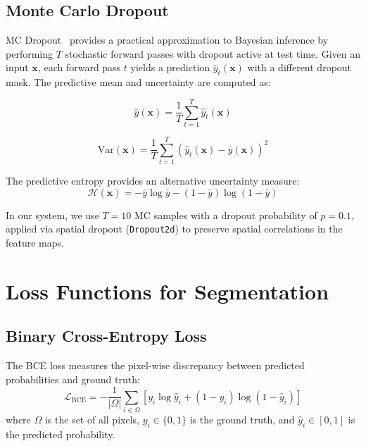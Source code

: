 \subsection{Monte Carlo Dropout}
\label{sec:bg:mcdropout}

\ac{MC} Dropout~\cite{gal2016dropout} provides a practical approximation to Bayesian inference by performing $T$ stochastic forward passes with dropout active at test time. Given an input $\mathbf{x}$, each forward pass $t$ yields a prediction $\hat{y}_t(\mathbf{x})$ with a different dropout mask. The predictive mean and uncertainty are computed as:

\begin{equation}
	\bar{y}(\mathbf{x}) = \frac{1}{T} \sum_{t=1}^{T} \hat{y}_t(\mathbf{x})
\end{equation}

\begin{equation}
	\text{Var}(\mathbf{x}) = \frac{1}{T} \sum_{t=1}^{T} \left(\hat{y}_t(\mathbf{x}) - \bar{y}(\mathbf{x})\right)^2
\end{equation}

The predictive entropy provides an alternative uncertainty measure:
\begin{equation}
	\mathcal{H}(\mathbf{x}) = -\bar{y} \log \bar{y} - (1 - \bar{y}) \log (1 - \bar{y})
\end{equation}

In our system, we use $T = 10$ \ac{MC} samples with a dropout probability of $p = 0.1$, applied via spatial dropout (\texttt{Dropout2d}) to preserve spatial correlations in the feature maps.


\section{Loss Functions for Segmentation}
\label{sec:bg:loss}

\subsection{Binary Cross-Entropy Loss}
\label{sec:bg:bce}

The \ac{BCE} loss measures the pixel-wise discrepancy between predicted probabilities and ground truth:
\begin{equation}
	\mathcal{L}_{\text{BCE}} = -\frac{1}{|\Omega|} \sum_{i \in \Omega} \left[ y_i \log \hat{y}_i + (1 - y_i) \log(1 - \hat{y}_i) \right]
\end{equation}
where $\Omega$ is the set of all pixels, $y_i \in \{0, 1\}$ is the ground truth, and $\hat{y}_i \in [0, 1]$ is the predicted probability.

